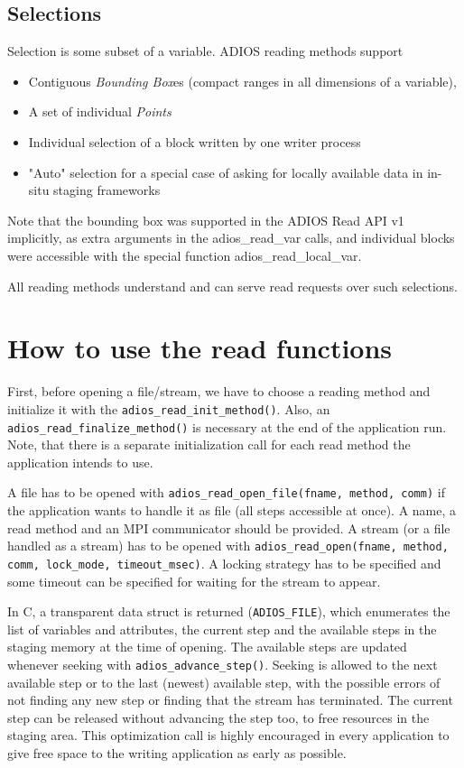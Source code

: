 \subsection{Selections}
Selection is some subset of a variable. ADIOS reading methods support 

\begin{itemize}
    \item Contiguous {\em Bounding Box}es (compact ranges in all dimensions of a variable), 
     \item A set of individual {\em Points}
    \item Individual selection of a block written by one writer process
         \item "Auto" selection for a special case of asking for locally available data in in-situ staging frameworks
\end{itemize}

\noindent Note that the bounding box was supported in the ADIOS Read API v1 implicitly, as extra arguments in the adios\_read\_var calls, and individual blocks were accessible with the special function adios\_read\_local\_var. 

All reading methods understand and can serve read requests over such selections.  

\section{How to use the read functions}
First, before opening a file/stream, we have to choose a reading method and initialize it with the \linebreak \verb+adios_read_init_method()+. Also, an \verb+adios_read_finalize_method()+ is necessary at the end of the application run. Note, that there is a separate initialization call for each read method the application intends to use.

A file has to be opened with \verb+adios_read_open_file(fname, method, comm)+ if the application wants to handle it as file (all steps accessible at once). A name, a read method and an MPI communicator should be provided. A stream (or a file handled as a stream) has to be opened with \linebreak
\verb+adios_read_open(fname, method, comm, lock_mode, timeout_msec)+.  A locking strategy has to be specified and some timeout can be specified for waiting for the stream to appear.  

In C, a transparent data struct is returned (\verb+ADIOS_FILE+), which enumerates the list of variables and attributes,  the current step and the available steps in the staging memory at the time of opening. The available steps are updated whenever seeking with \verb+adios_advance_step()+. Seeking is allowed to the next available step or to the last (newest) available step, with the possible errors of not finding any new step or finding that the stream has terminated. The current step can be released without advancing the step too, to free resources in the staging area. This optimization call is highly encouraged in every application to give free space to the writing application as early as possible. 

